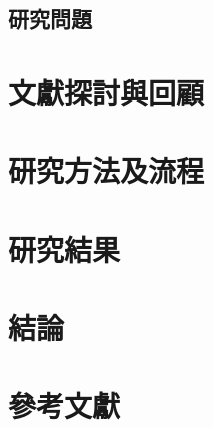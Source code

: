 \documentclass[12pt]{article}       %
\begin{document}


\subsection{研究問題} 
\hspace{2em}




\section{\centering 文獻探討與回顧}
\hspace{2em}




\section{\centering 研究方法及流程}
\hspace{2em}




\section{\centering 研究結果}





\section{\centering 結論} 




\section{\centering 參考文獻}
\vspace{-3.5em}  %
\renewcommand{\refname}{}  %
\printbibliography  %
\end{document}
